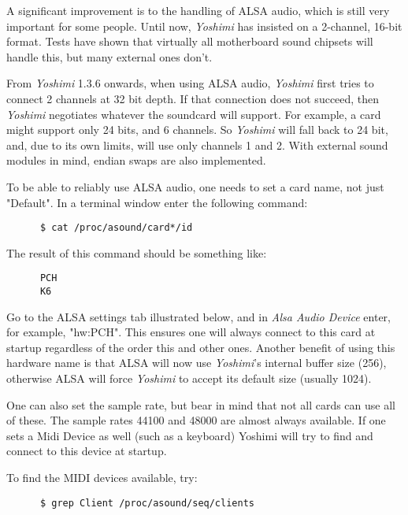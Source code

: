    A significant improvement is to the handling of ALSA audio, which is still
   very important for some people. Until now, \textsl{Yoshimi} has insisted
   on a 2-channel, 16-bit format. Tests have shown that virtually all
   motherboard sound chipsets will handle this, but many external ones don't.

   From \textsl{Yoshimi} 1.3.6 onwards, when using ALSA audio,
   \textsl{Yoshimi} first tries to connect 2 channels at 32 bit depth.  If
   that connection does not succeed, then \textsl{Yoshimi} negotiates
   whatever the soundcard will support.  For example, a card might support
   only 24 bits, and 6 channels.  So \textsl{Yoshimi} will fall back to
   24 bit, and, due to its own limits, will use only channels 1 and 2.
   With external sound modules in mind, endian swaps are also implemented.

   To be able to reliably use ALSA audio, one needs to set a card name, not just
   "Default".  In a terminal window enter the following command:

   \begin{verbatim}
      $ cat /proc/asound/card*/id
   \end{verbatim}

   The result of this command should be something like:

   \begin{verbatim}
      PCH
      K6
   \end{verbatim}

   Go to the ALSA settings tab illustrated below, and in 
   \textsl{Alsa Audio Device} enter, for example, "hw:PCH".
   This ensures one will always connect to this card at startup regardless of
   the order this and other ones.  Another benefit of using this hardware name
   is that ALSA will now use \textsl{Yoshimi}'s internal
   buffer size (256), otherwise ALSA will force \textsl{Yoshimi} to accept its
   default size (usually 1024).

   One can also set the sample rate, but bear in mind that not all cards can use
   all of these.  The sample rates 44100 and 48000 are almost always available.
   If one sets a Midi Device as well (such as a keyboard) Yoshimi will try to
   find and connect to this device at startup.

   To find the MIDI devices available, try:

   \begin{verbatim}
      $ grep Client /proc/asound/seq/clients
   \end{verbatim}

